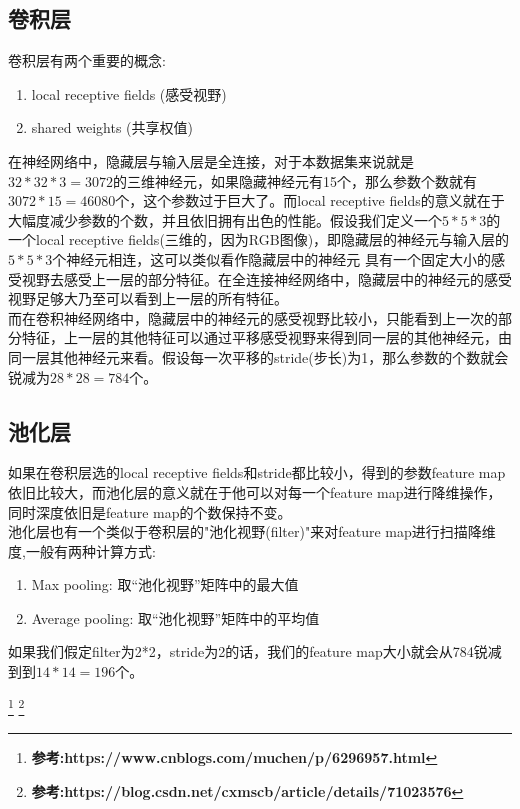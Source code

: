 \documentclass[a4paper,UTF8]{article}
\numberwithin{equation}{section}
\begin{document}
\begin{enumerate}[(1)]
	\subsection{卷积层}
	卷积层有两个重要的概念:
	\begin{enumerate}
		\item local receptive fields (感受视野)
		\item shared weights (共享权值)
	\end{enumerate}
	在神经网络中，隐藏层与输入层是全连接，对于本数据集来说就是$32*32*3=3072$的三维神经元，如果隐藏神经元有15个，那么参数个数就有$3072*15=46080$个，这个参数过于巨大了。而local receptive fields的意义就在于大幅度减少参数的个数，并且依旧拥有出色的性能。假设我们定义一个$5*5*3$的一个local receptive fields(三维的，因为RGB图像)，即隐藏层的神经元与输入层的$5*5*3$个神经元相连，这可以类似看作隐藏层中的神经元 具有一个固定大小的感受视野去感受上一层的部分特征。在全连接神经网络中，隐藏层中的神经元的感受视野足够大乃至可以看到上一层的所有特征。\\
	而在卷积神经网络中，隐藏层中的神经元的感受视野比较小，只能看到上一次的部分特征，上一层的其他特征可以通过平移感受视野来得到同一层的其他神经元，由同一层其他神经元来看。假设每一次平移的stride(步长)为1，那么参数的个数就会锐减为$28*28=784$个。
	
	\subsection{池化层}
	如果在卷积层选的local receptive fields和stride都比较小，得到的参数feature map依旧比较大，而池化层的意义就在于他可以对每一个feature map进行降维操作，同时深度依旧是feature map的个数保持不变。\\
	池化层也有一个类似于卷积层的"池化视野(filter)"来对feature map进行扫描降维度,一般有两种计算方式:
	\begin{enumerate}
		\item Max pooling: 取“池化视野”矩阵中的最大值
		\item Average pooling: 取“池化视野”矩阵中的平均值
	\end{enumerate}
	如果我们假定filter为2*2，stride为2的话，我们的feature map大小就会从784锐减到到$14*14=196$个。
	
	
	
\end{enumerate}
\footnote{\textbf{参考:https://www.cnblogs.com/muchen/p/6296957.html}}
\footnote{\textbf{参考:https://blog.csdn.net/cxmscb/article/details/71023576}}
\end{document}
